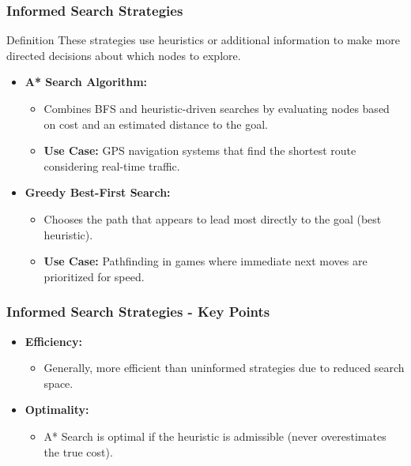 \documentclass[aspectratio=169]{beamer}
\begin{document}
\begin{frame}[fragile]
    \frametitle{Informed Search Strategies}
    \begin{block}{Definition}
        These strategies use heuristics or additional information to make more directed decisions about which nodes to explore.
    \end{block}
    \begin{itemize}
        \item \textbf{A* Search Algorithm:}
        \begin{itemize}
            \item Combines BFS and heuristic-driven searches by evaluating nodes based on cost and an estimated distance to the goal.
            \item \textbf{Use Case:} GPS navigation systems that find the shortest route considering real-time traffic.
        \end{itemize}
        \item \textbf{Greedy Best-First Search:}
        \begin{itemize}
            \item Chooses the path that appears to lead most directly to the goal (best heuristic).
            \item \textbf{Use Case:} Pathfinding in games where immediate next moves are prioritized for speed.
        \end{itemize}
    \end{itemize}
\end{frame}

\begin{frame}[fragile]
    \frametitle{Informed Search Strategies - Key Points}
    \begin{itemize}
        \item \textbf{Efficiency:}
            \begin{itemize}
                \item Generally, more efficient than uninformed strategies due to reduced search space.
            \end{itemize}
        \item \textbf{Optimality:}
            \begin{itemize}
                \item A* Search is optimal if the heuristic is admissible (never overestimates the true cost).
            \end{itemize}
    \end{itemize}
\end{frame}
\end{document}
